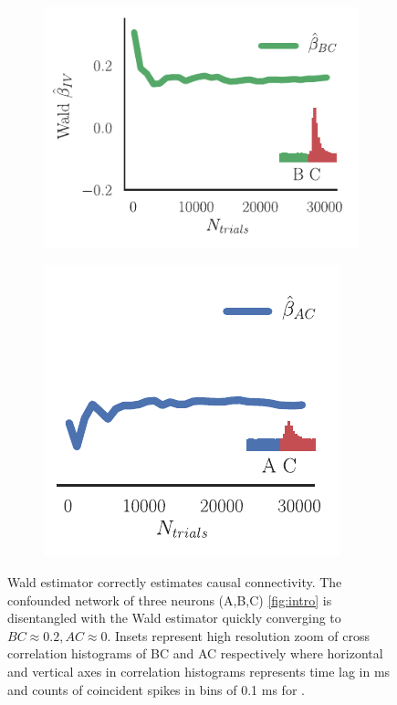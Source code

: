\documentclass[11pt]{article}
\begin{document}
\begin{figure}
\makeatletter
\renewcommand\p@subfigure{}
\makeatother
\begin{subfigure}{0.485\textwidth} \includegraphics[scale=1]{wald_BC}
\caption{} \label{fig:cchvswald:1}
\end{subfigure}\hfill
\begin{subfigure}{0.485\textwidth} \includegraphics[scale=1]{wald_AC}
\caption{} \label{fig:cchvswald:2}
\end{subfigure}
\caption{Wald estimator correctly estimates causal connectivity. The confounded network of three neurons (A,B,C) \cref{fig:intro} is disentangled with the Wald estimator quickly converging to $ BC \approx 0.2, AC \approx 0 $. Insets represent high resolution zoom of cross correlation histograms of BC and AC respectively where horizontal and vertical axes in correlation histograms represents time lag in ms and counts of coincident spikes in bins of 0.1 ms for . \label{fig:cchvswald}}
\end{figure}
\end{document}
